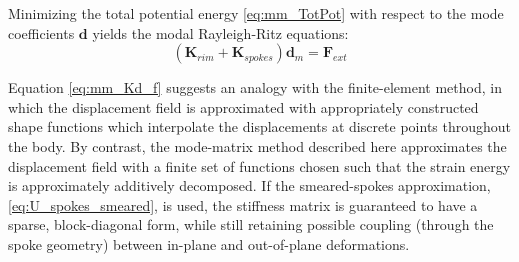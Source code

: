\documentclass[\rootdir/thesis.tex]{subfiles}
\begin{document}
Minimizing the total potential energy \eqref{eq:mm_TotPot} with respect to the mode coefficients $\mathbf{d}$ yields the modal Rayleigh-Ritz equations:
\begin{equation}
\label{eq:mm_Kd_f}
\left( \mathbf{K}_{rim} + \mathbf{K}_{spokes} \right) \mathbf{d}_m = \mathbf{F}_{ext}
\end{equation}

Equation \eqref{eq:mm_Kd_f} suggests an analogy with the finite-element method, in which the displacement field is approximated with appropriately constructed shape functions which interpolate the displacements at discrete points throughout the body. By contrast, the mode-matrix method described here approximates the displacement field with a finite set of functions chosen such that the strain energy is approximately additively decomposed. If the smeared-spokes approximation, \eqref{eq:U_spokes_smeared}, is used, the stiffness matrix is guaranteed to have a sparse, block-diagonal form, while still retaining possible coupling (through the spoke geometry) between in-plane and out-of-plane deformations.
\end{document}

